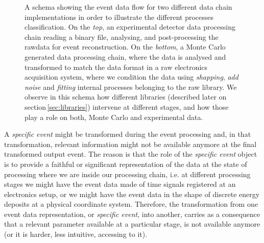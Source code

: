 \begin{figure}[h]
  \centering
	\caption{A schema showing the event data flow for two different data chain implementations in order to illustrate the different processes classification. On the \emph{top}, an experimental detector data processing chain reading a binary file, analysing, and post-processing the rawdata for event reconstruction. On the \emph{bottom}, a Monte Carlo generated data processing chain, where the data is analysed and transformed to match the data format in a raw electronics acquisition system, where we condition the data using \emph{shapping}, \emph{add noise} and \emph{fitting} internal processes belonging to the raw library. We observe in this schema how different libraries (described later on section\,\ref{sec:libraries}) intervene at different stages, and how those play a role on both, Monte Carlo and experimental data.}  \label{fig:dataChain}
\end{figure}

A \emph{specific event} might be transformed during the event processing and, in that transformation, relevant information might not be available anymore at the final transformed output event. The reason is that the role of the \emph{specific event} object is to provide a faithful or significant representation of the data at the state of processing where we are inside our processing chain, i.e. at different processing stages we might have the event data made of time signals registered at an electronics setup, or we might have the event data in the shape of discrete energy deposits at a physical coordinate system. Therefore, the transformation from one event data representation, or \emph{specific event}, into another, carries as a consequence that a relevant parameter available at a particular stage, is not available anymore (or it is harder, less intuitive, accessing to it). 

